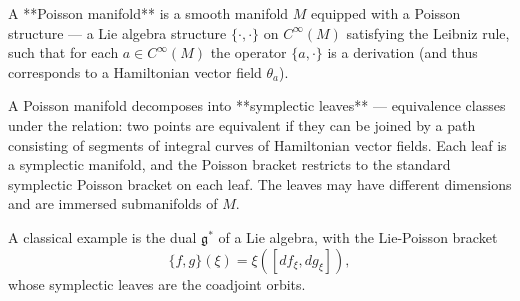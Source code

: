 A **Poisson manifold** is a smooth manifold $M$ equipped with a Poisson structure — a Lie algebra structure $\{\cdot, \cdot\}$ on $C^\infty(M)$ satisfying the Leibniz rule, such that for each $a \in C^\infty(M)$ the operator $\{a, \cdot\}$ is a derivation (and thus corresponds to a Hamiltonian vector field $\theta_a$).

A Poisson manifold decomposes into **symplectic leaves** — equivalence classes under the relation: two points are equivalent if they can be joined by a path consisting of segments of integral curves of Hamiltonian vector fields. Each leaf is a symplectic manifold, and the Poisson bracket restricts to the standard symplectic Poisson bracket on each leaf. The leaves may have different dimensions and are immersed submanifolds of $M$.

A classical example is the dual $\mathfrak{g}^*$ of a Lie algebra, with the Lie-Poisson bracket
$$\{f, g\}(\xi) = \xi([df_\xi, dg_\xi]),$$
whose symplectic leaves are the coadjoint orbits.
